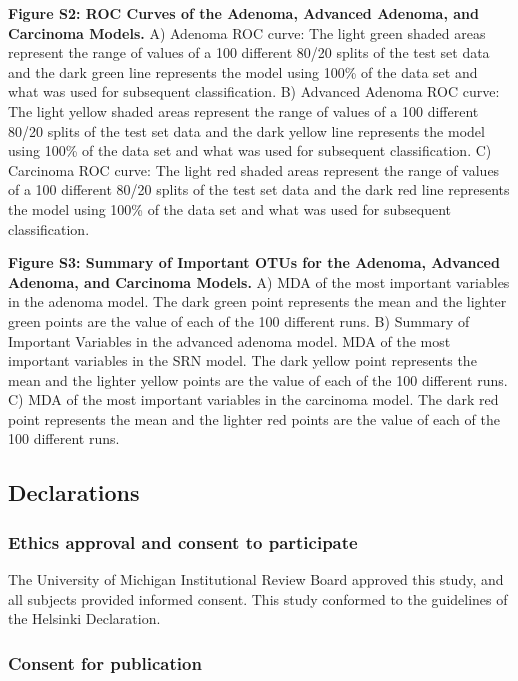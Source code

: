 \documentclass[12pt,]{article}
\begin{document}
\textbf{Figure S2: ROC Curves of the Adenoma, Advanced Adenoma, and
Carcinoma Models.} A) Adenoma ROC curve: The light green shaded areas
represent the range of values of a 100 different 80/20 splits of the
test set data and the dark green line represents the model using 100\%
of the data set and what was used for subsequent classification. B)
Advanced Adenoma ROC curve: The light yellow shaded areas represent the
range of values of a 100 different 80/20 splits of the test set data and
the dark yellow line represents the model using 100\% of the data set
and what was used for subsequent classification. C) Carcinoma ROC curve:
The light red shaded areas represent the range of values of a 100
different 80/20 splits of the test set data and the dark red line
represents the model using 100\% of the data set and what was used for
subsequent classification.

\textbf{Figure S3: Summary of Important OTUs for the Adenoma, Advanced
Adenoma, and Carcinoma Models.} A) MDA of the most important variables
in the adenoma model. The dark green point represents the mean and the
lighter green points are the value of each of the 100 different runs. B)
Summary of Important Variables in the advanced adenoma model. MDA of the
most important variables in the SRN model. The dark yellow point
represents the mean and the lighter yellow points are the value of each
of the 100 different runs. C) MDA of the most important variables in the
carcinoma model. The dark red point represents the mean and the lighter
red points are the value of each of the 100 different runs.

\newpage

\subsection{Declarations}\label{declarations}

\subsubsection{Ethics approval and consent to
participate}\label{ethics-approval-and-consent-to-participate}

The University of Michigan Institutional Review Board approved this
study, and all subjects provided informed consent. This study conformed
to the guidelines of the Helsinki Declaration.

\subsubsection{Consent for publication}\label{consent-for-publication}
\end{document}
